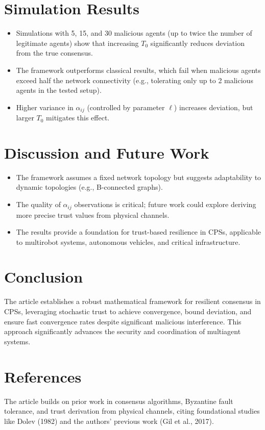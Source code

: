 \documentclass{article}
\begin{document}
\section*{Simulation Results}
\begin{itemize}
    \item Simulations with 5, 15, and 30 malicious agents (up to twice the number of legitimate agents) show that increasing $T_0$ significantly reduces deviation from the true consensus.
    \item The framework outperforms classical results, which fail when malicious agents exceed half the network connectivity (e.g., tolerating only up to 2 malicious agents in the tested setup).
    \item Higher variance in $\alpha_{ij}$ (controlled by parameter $\ell$) increases deviation, but larger $T_0$ mitigates this effect.
\end{itemize}

\section*{Discussion and Future Work}
\begin{itemize}
    \item The framework assumes a fixed network topology but suggests adaptability to dynamic topologies (e.g., B-connected graphs).
    \item The quality of $\alpha_{ij}$ observations is critical; future work could explore deriving more precise trust values from physical channels.
    \item The results provide a foundation for trust-based resilience in CPSs, applicable to multirobot systems, autonomous vehicles, and critical infrastructure.
\end{itemize}

\section*{Conclusion}
The article establishes a robust mathematical framework for resilient consensus in CPSs, leveraging stochastic trust to achieve convergence, bound deviation, and ensure fast convergence rates despite significant malicious interference. This approach significantly advances the security and coordination of multiagent systems.

\section*{References}
The article builds on prior work in consensus algorithms, Byzantine fault tolerance, and trust derivation from physical channels, citing foundational studies like Dolev (1982) and the authors' previous work (Gil et al., 2017).
\end{document}

